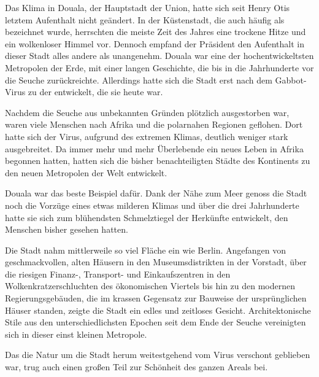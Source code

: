 Das Klima in Douala, der Hauptstadt der Union, hatte sich seit Henry Otis letztem Aufenthalt nicht geändert.
In der Küstenstadt, die auch häufig als  bezeichnet wurde, herrschten die meiste Zeit des Jahres eine trockene Hitze und ein wolkenloser Himmel vor.
Dennoch empfand der Präsident den Aufenthalt in dieser Stadt alles andere als unangenehm.
Douala war eine der hochentwickeltsten Metropolen der Erde, mit einer langen Geschichte, die bis in die Jahrhunderte vor die Seuche zurückreichte.
Allerdings hatte sich die Stadt erst nach dem Gabbot-Virus zu der entwickelt, die sie heute war.

\par

Nachdem die Seuche aus unbekannten Gründen plötzlich ausgestorben war, waren viele Menschen nach Afrika und die polarnahen Regionen geflohen.
Dort hatte sich der Virus, aufgrund des extremen Klimas, deutlich weniger stark ausgebreitet.
Da immer mehr und mehr Überlebende ein neues Leben in Afrika begonnen hatten, hatten sich die bisher benachteiligten Städte des Kontinents zu den neuen Metropolen der Welt entwickelt.

\par

Douala war das beste Beispiel dafür.
Dank der Nähe zum Meer genoss die Stadt noch die Vorzüge eines etwas milderen Klimas und über die drei Jahrhunderte hatte sie sich zum blühendsten Schmelztiegel der Herkünfte entwickelt, den Menschen bisher gesehen hatten.

\par

Die Stadt nahm mittlerweile so viel Fläche ein wie Berlin.
Angefangen von geschmackvollen, alten Häusern in den Museumsdistrikten in der Vorstadt, über die riesigen Finanz-, Transport- und Einkaufszentren in den Wolkenkratzerschluchten des ökonomischen Viertels bis hin zu den modernen Regierungsgebäuden, die im krassen Gegensatz zur Bauweise der ursprünglichen Häuser standen, zeigte die Stadt ein edles und zeitloses Gesicht.
Architektonische Stile aus den unterschiedlichsten Epochen seit dem Ende der Seuche vereinigten sich in dieser einst kleinen Metropole.

\par

Das die Natur um die Stadt herum weitestgehend vom Virus verschont geblieben war, trug auch einen großen Teil zur Schönheit des ganzen Areals bei.

\par

